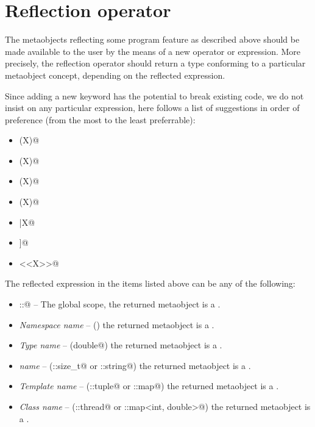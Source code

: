 \section{Reflection operator}
\label{section-reflection-operator}

The metaobjects reflecting some program feature \verb@X@ as
described above should be made available to the user by
the means of a new operator or expression.
More precisely, the reflection operator should return a type conforming to a particular
metaobject concept, depending on the reflected expression.

Since adding a new keyword has the potential to break existing code,
we do not insist on any particular expression, here follows a list of suggestions
in order of preference (from the most to the least preferrable):

\begin{itemize}
\item{\verb@mirrored(X)@}
\item{\verb@reflected(X)@}
\item{\verb@reflexpr(X)@}
\item{\verb@constexpr(X)@}
\item{\verb@|X@}
\item{\verb@[[X]]@}
\item{\verb@<<X>>@}
\end{itemize}

The reflected expression \verb@X@ in the items listed above can be any of the following:

\begin{itemize}
\item{\verb@::@} -- The global scope, the returned metaobject is a {}.
\item{{\em Namespace name}} -- (\verb@std@) the returned metaobject is a {}.
\item{{\em Type name}} -- (\verb@long double@) the returned metaobject is a {}.
\item{{\em \verb@typedef@ name}} -- (\verb@std::size_t@ or \verb@std::string@)
     the returned metaobject is a {}.
\item{{\em Template name}} -- (\verb@std::tuple@ or \verb@std::map@)
     the returned metaobject is a {}.
\item{{\em Class name}} -- (\verb@std::thread@ or \verb@std::map<int, double>@)
     the returned metaobject is a {}.
\end{itemize}

